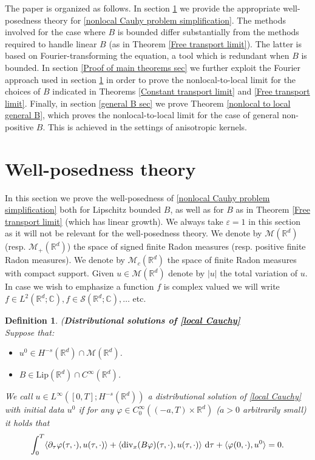 \documentclass[11pt,reqno]{amsart}
\newtheorem{defn}[thm]{Definition}
\numberwithin{equation}{section}
\def\dd{{\rm d}}
\begin{document}
The paper is organized as follows. In section \ref{Well posedness sec} we provide the appropriate well-posedness theory for \eqref{nonlocal Cauhy problem simplification}. The methods involved for the case where $B$ is bounded differ substantially from the methods required to handle linear $B$ (as in Theorem \ref{Free transport limit}). The latter is based on Fourier-transforming the equation, a tool which is redundant when $B$ is bounded. In section \ref{Proof of main theorems sec} we further exploit the Fourier approach used in section \ref{Well posedness sec} in order to prove the nonlocal-to-local limit for the choices of $B$ indicated in Theorems \ref{Constant transport limit} and \ref{Free transport limit}. Finally, in section \ref{general B sec} we prove Theorem \ref{nonlocal to local general B}, which proves the nonlocal-to-local limit for the case of general non-positive $B$. This is achieved  in the settings of anisotropic kernels. \section{Well-posedness theory}\label{Well posedness sec}
In this section we prove the well-posedness of \eqref{nonlocal Cauhy problem simplification} both for Lipschitz bounded $B$, as well as for $B$ as in Theorem \ref{Free transport limit} (which has linear growth). We always take $\varepsilon=1$ in this section as it will not be relevant for the well-posedness theory.   
We denote by $\mathcal{M}(\mathbb{R}^{d})$ (resp. $\mathcal{M}_{+}(\mathbb{R}^{d})$) the space of signed finite Radon measures (resp. positive finite Radon measures). We denote by $\mathcal{M}_{c}(\mathbb{R}^{d})$ the space of finite Radon measures with compact support. Given $u\in \mathcal{M}({\mathbb{R}}^{d})$ denote by $\left\vert u\right\vert$ the total variation of $u$. In case we wish to emphasize a function $f$ is complex valued we will write $f\in L^{2}(\mathbb{R}^{d};\mathbb{C}),f\in \mathcal{S}(\mathbb{R}^{d};\mathbb{C}),\dots$ etc.  
\begin{defn}\textup{(\textbf{Distributional solutions of \eqref{local Cauchy}}}\\
Suppose that: 
\begin{itemize}
    \item $u^{0}\in H^{-s}(\mathbb{R}^{d})\cap \mathcal{M}(\mathbb{R}^{d})$. 
    \item $B\in \mathrm{Lip}(\mathbb{R}^{d})\cap C^{\infty}(\mathbb{R}^{d})$.
\end{itemize}
We call $u\in L^{\infty}([0,T];H^{-s}(\mathbb{R}^{d}))$ a distributional solution of \eqref{local Cauchy} with initial data $u^{0}$ if for any $\varphi\in C^{\infty}_{0}((-a,T)\times \mathbb{R}^{d})$ ($a>0$ arbitrarily small) it holds that 
\begin{align*}
\int_{0}^{T}\langle \partial_{\tau}\varphi(\tau,\cdot),u(\tau,\cdot)\rangle+\langle\mathrm{div}_{x}(B\varphi)(\tau,\cdot),u(\tau,\cdot)\rangle \ \dd \tau +\langle \varphi(0,\cdot),u^{0}\rangle =0.    
\end{align*}
\end{defn}
\end{document}

